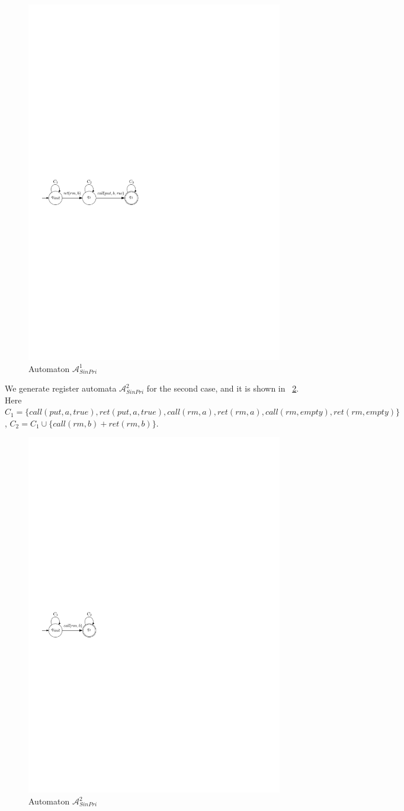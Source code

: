 \begin{figure}[htbp]
  \centering
  \includegraphics[width=0.5 \textwidth]{figures/PIC_AUTO_FIFO_1.pdf}
  \caption{Automaton $\mathcal{A}_{\textit{SinPri}}^1$}
  \label{fig:automata for FIFO-1 in appendix}
\end{figure}


We generate register automata $\mathcal{A}_{\textit{SinPri}}^2$ for the second case, and it is shown in \figurename~\ref{fig:automata for FIFO-2}. Here $C_1 = \{ \textit{call}(\textit{put},a,\textit{true}),\textit{ret}(\textit{put},a,\textit{true}), \textit{call}(\textit{rm},a),\textit{ret}(\textit{rm},a),\textit{call}(\textit{rm},\textit{empty}),\textit{ret}(\textit{rm},\textit{empty}) \}$, $C_2 = C_1 \cup \{ \textit{call}(\textit{rm},b) + \textit{ret}(\textit{rm},b) \}$.


\begin{figure}[htbp]
  \centering
  \includegraphics[width=0.3 \textwidth]{figures/PIC_AUTO_FIFO_2.pdf}
  \caption{Automaton $\mathcal{A}_{\textit{SinPri}}^2$}
  \label{fig:automata for FIFO-2}
\end{figure}

